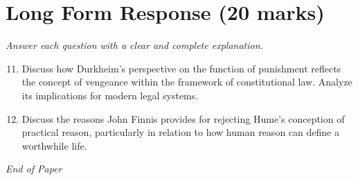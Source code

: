 \documentclass[12pt]{article}
\begin{document}
\section*{Long Form Response (20 marks)}
\textit{Answer each question with a clear and complete explanation.}
\begin{enumerate}[label=\arabic*.]
\setcounter{enumi}{10}
\item Discuss how Durkheim's perspective on the function of punishment reflects the concept of vengeance within the framework of constitutional law. Analyze its implications for modern legal systems.
\item Discuss the reasons John Finnis provides for rejecting Hume's conception of practical reason, particularly in relation to how human reason can define a worthwhile life.
\end{enumerate}

\vfill
\noindent\textit{End of Paper}
\end{document}
